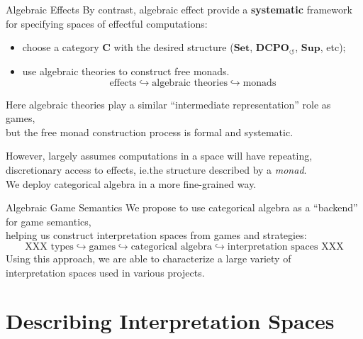 \documentclass[aspectratio=1610,mathserif]{beamer}
\newcommand\divtok{{\circlearrowleft}}
\begin{document}
\begin{frame}{Algebraic Effects}
  By contrast, algebraic effect provide a \textbf{systematic} framework \\
  for specifying spaces of effectful computations:
  \begin{itemize}
    \item choose a category $\mathbf{C}$
      with the desired structure
      ($\mathbf{Set}$, $\mathbf{DCPO}_\divtok$, $\mathbf{Sup}$, etc);
    \item use algebraic theories to construct free monads.
    \[ \text{effects} \hookrightarrow
       \text{algebraic theories} \hookrightarrow
       \text{monads} \]
  \end{itemize}
  Here algebraic theories play a similar
  ``intermediate representation'' role as games, \\
  but the free monad construction process is formal and systematic.

  \pause
  \vspace{1em}
  However, largely assumes computations in a space
  will have repeating, discretionary access to effects,
  ie.\@ the structure described by a \emph{monad}. \\

  \vspace{1em}
  We deploy categorical algebra in a more fine-grained way.
\end{frame}

\begin{frame}{Algebraic Game Semantics}
  We propose to use categorical algebra as a ``backend'' for game semantics, \\
  helping us construct interpretation spaces from games and strategies:
  \[
    \text{XXX }
    \text{types} \hookrightarrow
    \text{games} \hookrightarrow
    \text{categorical algebra} \hookrightarrow
    \text{interpretation spaces}
    \text{ XXX}
  \]
  Using this approach, we are able to characterize a large variety of \\
  interpretation spaces used in various projects.
\end{frame}

\section{Describing Interpretation Spaces}
\frame\sectionpage
\end{document}
